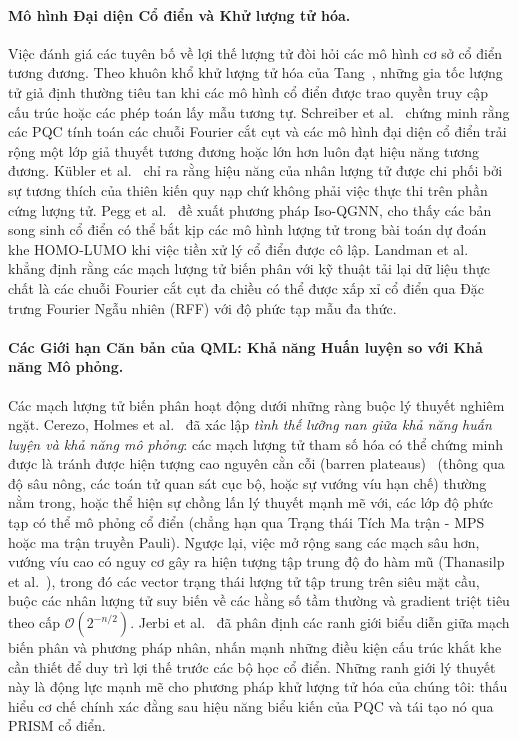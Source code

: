 \documentclass[10pt,twocolumn,letterpaper]{article}
\begin{document}
\paragraph{Mô hình Đại diện Cổ điển và Khử lượng tử hóa.}
Việc đánh giá các tuyên bố về lợi thế lượng tử đòi hỏi các mô hình cơ sở cổ điển tương đương. Theo khuôn khổ khử lượng tử hóa của Tang~\cite{Tang:2018lmw}, những gia tốc lượng tử giả định thường tiêu tan khi các mô hình cổ điển được trao quyền truy cập cấu trúc hoặc các phép toán lấy mẫu tương tự.
Schreiber et al.~\cite{Schreiber:2022roq} chứng minh rằng các PQC tính toán các chuỗi Fourier cắt cụt và các mô hình đại diện cổ điển trải rộng một lớp giả thuyết tương đương hoặc lớn hơn luôn đạt hiệu năng tương đương.
K\"ubler et al.~\cite{kubler2021inductive} chỉ ra rằng hiệu năng của nhân lượng tử được chi phối bởi sự tương thích của thiên kiến quy nạp chứ không phải việc thực thi trên phần cứng lượng tử.
Pegg et al.~\cite{pegg2026isoqgnn} đề xuất phương pháp Iso-QGNN, cho thấy các bản song sinh cổ điển có thể bắt kịp các mô hình lượng tử trong bài toán dự đoán khe HOMO-LUMO khi việc tiền xử lý cổ điển được cô lập.
Landman et al.~\cite{landman2023approximating} khẳng định rằng các mạch lượng tử biến phân với kỹ thuật tải lại dữ liệu thực chất là các chuỗi Fourier cắt cụt đa chiều có thể được xấp xỉ cổ điển qua Đặc trưng Fourier Ngẫu nhiên (RFF) với độ phức tạp mẫu đa thức.

\paragraph{Các Giới hạn Căn bản của QML: Khả năng Huấn luyện so với Khả năng Mô phỏng.}
Các mạch lượng tử biến phân hoạt động dưới những ràng buộc lý thuyết nghiêm ngặt.
Cerezo, Holmes et al.~\cite{Cerezo:2023nqf} đã xác lập \textit{tình thế lưỡng nan giữa khả năng huấn luyện và khả năng mô phỏng}: các mạch lượng tử tham số hóa có thể chứng minh được là tránh được hiện tượng cao nguyên cằn cỗi (barren plateaus)~\cite{Cerezo:2020mtn, McClean:2018jps} (thông qua độ sâu nông, các toán tử quan sát cục bộ, hoặc sự vướng víu hạn chế) thường nằm trong, hoặc thể hiện sự chồng lấn lý thuyết mạnh mẽ với, các lớp độ phức tạp có thể mô phỏng cổ điển (chẳng hạn qua Trạng thái Tích Ma trận - MPS hoặc ma trận truyền Pauli).
Ngược lại, việc mở rộng sang các mạch sâu hơn, vướng víu cao có nguy cơ gây ra hiện tượng tập trung độ đo hàm mũ (Thanasilp et al.~\cite{Thanasilp:2022agd}), trong đó các vector trạng thái lượng tử tập trung trên siêu mặt cầu, buộc các nhân lượng tử suy biến về các hằng số tầm thường và gradient triệt tiêu theo cấp $\mathcal{O}(2^{-n/2})$.
Jerbi et al.~\cite{Jerbi:2021qnz} đã phân định các ranh giới biểu diễn giữa mạch biến phân và phương pháp nhân, nhấn mạnh những điều kiện cấu trúc khắt khe cần thiết để duy trì lợi thế trước các bộ học cổ điển.
Những ranh giới lý thuyết này là động lực mạnh mẽ cho phương pháp khử lượng tử hóa của chúng tôi: thấu hiểu cơ chế chính xác đằng sau hiệu năng biểu kiến của PQC và tái tạo nó qua PRISM cổ điển.
\end{document}
